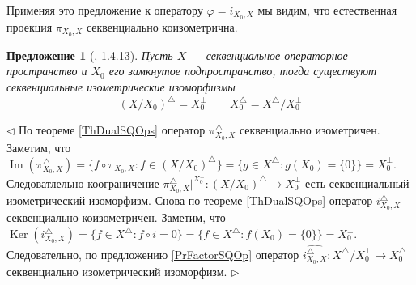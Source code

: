 \documentclass[12pt]{article}
\newtheorem{proposition}[theorem]{Предложение}
\newenvironment{proof}{\par $\triangleleft$}{$\triangleright$}
\begin{document}
Применяя это предложение к оператору $\varphi=i_{X_0,X}$ мы видим, что естественная проекция $\pi_{X_0,X}$ секвенциально коизометрична.

\begin{proposition}[\cite{LamOpFolgen}, 1.4.13]\label{PrDualForQuotsAndSubsp} Пусть $X$ --- секвенциальное операторное пространство и $X_0$ его замкнутое подпространство, тогда существуют секвенциальные изометрические изоморфизмы
$$
(X/X_0)^\triangle= X_0^\perp\qquad X_0^\triangle=X^\triangle/X_0^\perp
$$
\end{proposition}
\begin{proof} По теореме \ref{ThDualSQOps} оператор $\pi_{X_0,X}^\triangle$ секвенциально изометричен. Заметим, что $\operatorname{Im}(\pi_{X_0,X}^\triangle)=\{f\circ\pi_{X_0,X}:f\in (X/X_0)^\triangle\}=\{g\in X^\triangle: g(X_0)=\{0\}\}=X_0^\perp$. Следоватлельно коограничение $\pi_{X_0,X}^\triangle|^{X_0^\perp}:(X/X_0)^\triangle\to X_0^\perp$ есть секвенциальный изометрический изоморфизм. Снова по теореме \ref{ThDualSQOps} оператор $i_{X_0,X}^\triangle$ секвенциально коизометричен. Заметим, что $\operatorname{Ker}(i_{X_0,X}^\triangle)=\{f\in X^\triangle:f\circ i=0\}=\{f\in X^\triangle: f(X_0)=\{0\}\}=X_0^\perp$. Следовательно, по предложению \ref{PrFactorSQOp} оператор $\widehat{i_{X_0,X}^\triangle}:X^\triangle/X_0^\perp\to X_0^\triangle$ секвенциально изометрический изоморфизм.
\end{proof}
\end{document}

